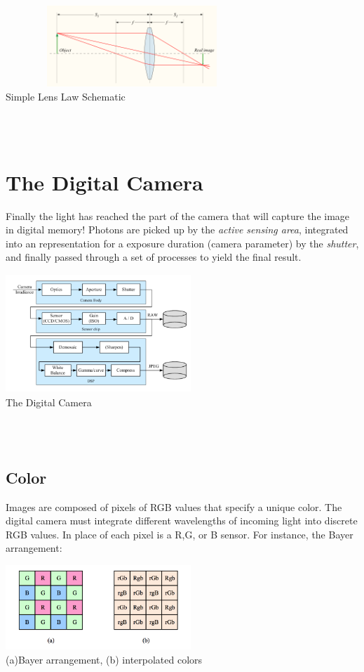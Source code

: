 \documentclass{article}
\begin{document}
\begin{center}
    \includegraphics[height=1.2in, width=3.75in]{L1F7} \\
    \caption{Simple Lens Law Schematic}
\end{center} \\ \\ 

\section{The Digital Camera}
Finally the light has reached the part of the camera that will capture the image in digital memory! Photons are picked up by the \textit{active sensing area}, integrated into an representation for a exposure duration (camera parameter) by the \textit{shutter}, and finally passed through a set of processes to yield the final result.    

\begin{center}
    \includegraphics[height=1.75in, width=2.75in]{L1F8} \\
    \caption{The Digital Camera}
\end{center} \\ \\

\subsection{Color}
Images are composed of pixels of RGB values that specify a unique color. The digital camera must integrate different wavelengths of incoming light into discrete RGB values. In place of each pixel is a R,G, or B sensor. For instance, the Bayer arrangement:

\begin{center}
    \includegraphics[height=1.25in, width=2.75in]{L1F10} \\
    \caption{(a)Bayer arrangement, (b) interpolated colors}
\end{center} \\ \\
\end{document}
